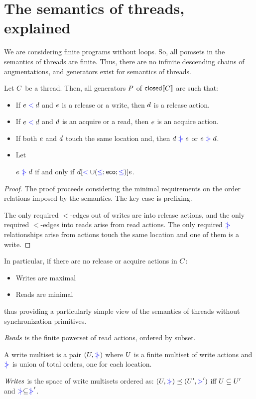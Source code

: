 \section{The semantics  of threads, explained}
We are considering finite programs without loops.  So,  all pomsets in the semantics of threads are finite.  Thus, there are no infinite descending chains of augmentations, and  generators exist for semantics of threads.

\begin{lemma}
Let $C$ be a thread.  Then, all generators $P$ of  $\textsf{closed}\llbracket C\rrbracket$  are such that:
\begin{itemize}
\item  If $e\mathrel{{\color{blue}<}}d$ and $e$ is a release or a write, then $d$ is a release action.
\item  If $e\mathrel{{\color{blue}<}}d$ and $d$ is an acquire or a read, then $e$ is an acquire action.
\item  If both $e$ and $d$ touch the same location and, then $d \mathrel{{\color{blue}\mkern4mu\mid\!\!\!>}} e$ or $e \mathrel{{\color{blue}\mkern4mu\mid\!\!\!>}} d$.
\item  Let

$e \mathrel{{\color{blue}\mkern4mu\mid\!\!\!>}} d$ if and only if $ d [\mathrel{{\color{blue}<}} \cup (\mathrel{{\color{blue}\leq}}; \mathrel{\mathsf{eco}};\mathrel{{\color{blue}\leq}})] e$. 
            
\end{itemize}
\end{lemma}
\begin{proof}
The proof proceeds considering the minimal requirements on the order relations imposed by the semantics.  The key case is prefixing.  

The only required $\lt$-edges out of writes are into release actions, and the only required $\lt$-edges into reads arise from read actions. The only required $\mathrel{{\color{blue}\mkern4mu\mid\!\!\!>}}$ relationships arise from actions touch the same location and one of them is a write.   
\end{proof}

In particular, if there are no release or acquire actions in $C$:
\begin{itemize}
\item Writes are maximal
\item Reads are minimal
\end{itemize}
thus providing a particularly simple view of the semantics of threads without synchronization primitives.   

\begin{definition}
$\mathit{Reads}$ is the finite powerset of read actions, ordered by subset.  

A write multiset is a pair $(U,\mathrel{{\color{blue}\mkern4mu\mid\!\!\!>}})$ where $U$ is a finite multiset of write actions and $\mathrel{{\color{blue}\mkern4mu\mid\!\!\!>}}$ is union of total orders, one for each location. 

$\mathit{Writes}$ is the space of write multisets ordered as:
$(U,\mathrel{{\color{blue}\mkern4mu\mid\!\!\!>}}) \preceq (U',\mathrel{{\color{blue}\mkern4mu\mid\!\!\!>}}')$ iff $U \subseteq U'$ and $\mathrel{{\color{blue}\mkern4mu\mid\!\!\!>}} \subseteq \mathrel{{\color{blue}\mkern4mu\mid\!\!\!>}}'$.
\end{definition}

